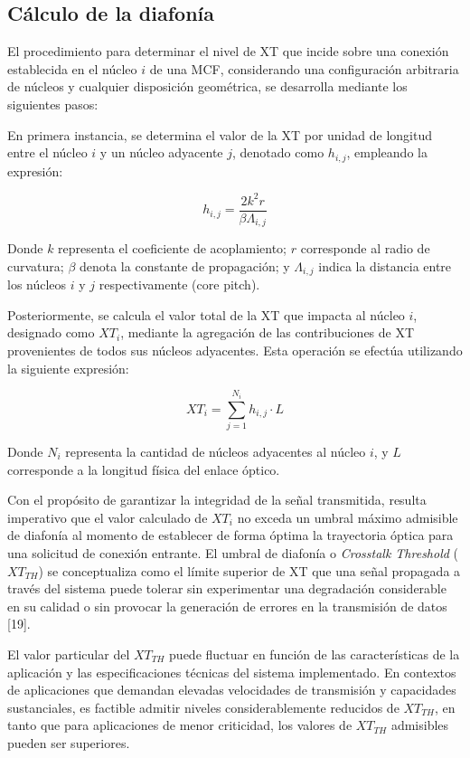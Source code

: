 \subsection{Cálculo de la diafonía}

El procedimiento para determinar el nivel de XT que incide sobre una conexión establecida en el núcleo $i$ de una MCF, considerando una configuración arbitraria de núcleos y cualquier disposición geométrica, se desarrolla mediante los siguientes pasos:

En primera instancia, se determina el valor de la XT por unidad de longitud entre el núcleo $i$ y un núcleo adyacente $j$, denotado como $h_{i,j}$, empleando la expresión:

\begin{equation}
h_{i,j} = \frac{2k^2r}{\beta\Lambda_{i,j}}
\end{equation}

Donde $k$ representa el coeficiente de acoplamiento; $r$ corresponde al radio de curvatura; $\beta$ denota la constante de propagación; y $\Lambda_{i,j}$ indica la distancia entre los núcleos $i$ y $j$ respectivamente (core pitch).

Posteriormente, se calcula el valor total de la XT que impacta al núcleo $i$, designado como $XT_i$, mediante la agregación de las contribuciones de XT provenientes de todos sus núcleos adyacentes. Esta operación se efectúa utilizando la siguiente expresión:

\begin{equation}
XT_i = \sum_{j=1}^{N_i} h_{i,j} \cdot L
\end{equation}

Donde $N_i$ representa la cantidad de núcleos adyacentes al núcleo $i$, y $L$ corresponde a la longitud física del enlace óptico.

Con el propósito de garantizar la integridad de la señal transmitida, resulta imperativo que el valor calculado de $XT_i$ no exceda un umbral máximo admisible de diafonía al momento de establecer de forma óptima la trayectoria óptica para una solicitud de conexión entrante. El umbral de diafonía o \textit{Crosstalk Threshold} ($XT_{TH}$) se conceptualiza como el límite superior de XT que una señal propagada a través del sistema puede tolerar sin experimentar una degradación considerable en su calidad o sin provocar la generación de errores en la transmisión de datos [19].

El valor particular del $XT_{TH}$ puede fluctuar en función de las características de la aplicación y las especificaciones técnicas del sistema implementado. En contextos de aplicaciones que demandan elevadas velocidades de transmisión y capacidades sustanciales, es factible admitir niveles considerablemente reducidos de $XT_{TH}$, en tanto que para aplicaciones de menor criticidad, los valores de $XT_{TH}$ admisibles pueden ser superiores.



